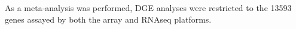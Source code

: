 As a meta-analysis was performed, \gls{DGE} analyses were restricted to the \num{13593} genes assayed by both the array and \gls{RNAseq} platforms.
%
